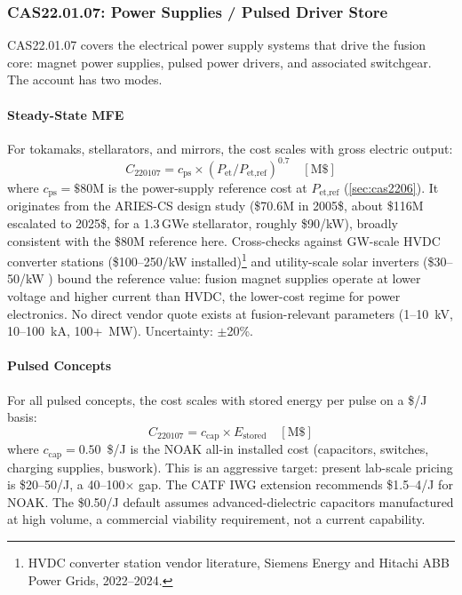 \documentclass{article}
\begin{document}
\subsubsection{CAS22.01.07: Power Supplies / Pulsed Driver Store}
\label{sec:cas2207}

CAS22.01.07 covers the electrical power supply systems that drive the
fusion core: magnet power supplies, pulsed power drivers, and associated
switchgear. The account has two modes.

\paragraph{Steady-State MFE}
For tokamaks, stellarators, and mirrors, the cost scales with gross
electric output:
\begin{equation}
\label{eq:cas2207-ps}
  C_{220107} = c_{\text{ps}} \times (P_{\text{et}} / P_{\text{et,ref}})^{0.7} \quad [\text{M\$}]
\end{equation}
where $c_{\text{ps}} = \$80$M is the power-supply reference cost at
$P_{\text{et,ref}}$ (\cref{sec:cas2206}). It originates from the ARIES-CS design study (\$70.6M in 2005\$, about
\$116M escalated to 2025\$, for a 1.3\,GWe stellarator, roughly \$90/kW),
broadly consistent with the \$80M reference here.
Cross-checks against GW-scale HVDC converter stations
(\$100--250/kW installed)\footnote{HVDC converter station vendor literature, Siemens Energy and Hitachi ABB Power Grids, 2022--2024.} and utility-scale solar inverters
(\$30--50/kW \citep{nrel_atb2024}) bound the reference value: fusion magnet supplies
operate at lower voltage and higher current than HVDC, the
lower-cost regime for power electronics. No direct vendor quote exists at
fusion-relevant parameters (1--10~kV, 10--100~kA, 100+~MW).
Uncertainty: $\pm$20\%.

\paragraph{Pulsed Concepts}
For all pulsed concepts, the cost scales with stored energy per
pulse on a \$/J basis:
\begin{equation}
  C_{220107} = c_{\text{cap}} \times E_{\text{stored}} \quad [\text{M\$}]
\end{equation}
where $c_{\text{cap}} = 0.50$~\$/J is the NOAK all-in installed cost
(capacitors, switches, charging supplies, buswork). This is an
aggressive target: present lab-scale pricing is \$20--50/J, a 40--100$\times$
gap. The CATF IWG extension \citep{woodruff2026b} recommends
\$1.5--4/J for NOAK. The \$0.50/J default assumes advanced-dielectric
capacitors manufactured at high volume, a commercial viability
requirement, not a current capability.
\end{document}
